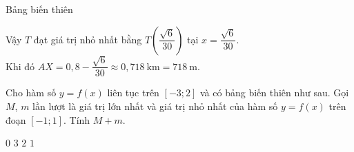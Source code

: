 \begin{bt}
{		Bảng biến thiên 
		\begin{center}
		\end{center} 
		Vậy $T$ đạt giá trị nhỏ nhất bằng $T\left(\dfrac{\sqrt{6}}{30}\right)$ tại $x=\dfrac{\sqrt{6}}{30}$.\\
		 Khi đó $AX=0{,}8-\dfrac{\sqrt{6}}{30}\approx 0{,}718 \ \text{km}= 718 \ \text{m}$.
	}
\end{bt}

\begin{ex}%
		Cho hàm số $y=f(x)$ liên tục trên $[-3;2]$ và có bảng biến thiên như sau. Gọi $M$, $m$ lần lượt là giá trị lớn nhất và giá trị nhỏ nhất của hàm  số $y=f(x)$ trên đoạn $[-1;1]$. Tính $M+m$.
		\begin{center}
		\end{center}
	\choice 
			{$0$} 
			{\True  $3$}
			 {$2$}
			{$1$} 
	\end{ex}

